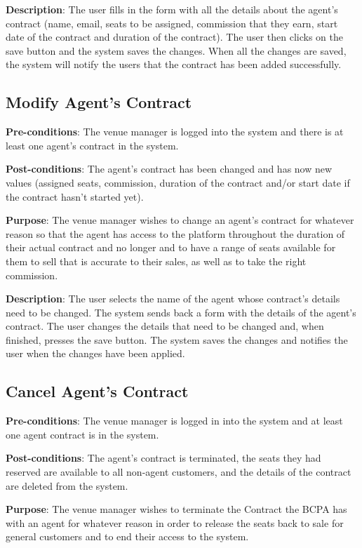 \textbf{Description}: The user fills in the form with all the details about the agent's contract (name, email, seats to be assigned, commission that they earn, start date of the contract and duration of the contract). The user then clicks on the save button and the system saves the changes. When all the changes are saved, the system will notify the users that the contract has been added successfully.

\subsection{Modify Agent's Contract}
\textbf{Pre-conditions}: The venue manager is logged into the system and there is at least one agent's contract in the system.

\textbf{Post-conditions}: The agent's contract has been changed and has now new values (assigned seats, commission, duration of the contract and/or start date if the contract hasn't started yet).

\textbf{Purpose}: The venue manager wishes to change an agent's contract for whatever reason so that the agent has access to the platform throughout the duration of their actual contract and no longer and to have a range of seats available for them to sell that is accurate to their sales, as well as to take the right commission.

\textbf{Description}: The user selects the name of the agent whose contract's details need to be changed. The system sends back a form with the details of the agent's contract. The user changes the details that need to be changed and, when finished, presses the save button. The system saves the changes and notifies the user when the changes have been applied.

\subsection{Cancel Agent's Contract}
\textbf{Pre-conditions}: The venue manager is logged in into the system and at least one agent contract is in the system.

\textbf{Post-conditions}: The agent's contract is terminated, the seats they had reserved are available to all non-agent customers, and the details of the contract are deleted from the system.

\textbf{Purpose}: The venue manager wishes to terminate the Contract the BCPA has with an agent for whatever reason in order to release the seats back to sale for general customers and to end their access to the system.


